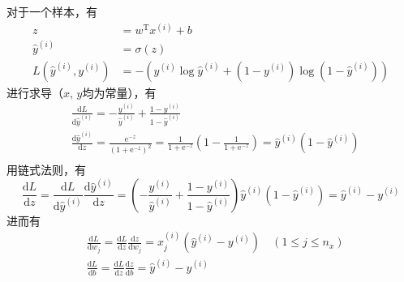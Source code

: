 	\vspace{0.5\baselineskip}
	对于一个样本，有
	\begin{equation}
		\begin{aligned}
		z &= w^\mathrm{T} x^{(i)} + b \\
		\hat{y}^{(i)} &= \sigma(z) \\
		L(\hat{y}^{(i)}, y^{(i)}) &= -(y^{(i)} \log \hat{y}^{(i)} + (1 - y^{(i)}) \log (1 - \hat{y}^{(i)}))
		\end{aligned} 
		\label{eq:gradient_logistic_sample}
	\end{equation}
	进行求导（$x$, $y$均为常量），有
	\begin{equation}
		\begin{aligned}
		&\frac{\mathrm{d}L}{\mathrm{d}\hat{y}^{(i)}} = -\frac{y^{(i)}}{\hat{y}^{(i)}} + \frac{1 - y^{(i)}}{1 - \hat{y}^{(i)}} \\
		&\frac{\mathrm{d}\hat{y}^{(i)}}{\mathrm{d}z} = \frac{\mathrm{e}^{-z}}{(1 + \mathrm{e}^{-z})^2} = \frac{1}{1 + \mathrm{e}^{-z}}(1 - \frac{1}{1 + \mathrm{e}^{-z}}) = \hat{y}^{(i)}(1 - \hat{y}^{(i)})\\
		\end{aligned}
	\end{equation}
	用链式法则，有
	\begin{equation}
		\frac{\mathrm{d}L}{\mathrm{d}z} = \frac{\mathrm{d}L}{\mathrm{d}\hat{y}^{(i)}} \frac{\mathrm{d}\hat{y}^{(i)}}{\mathrm{d}z} = (-\frac{y^{(i)}}{\hat{y}^{(i)}} + \frac{1 - y^{(i)}}{1 - \hat{y}^{(i)}})\hat{y}^{(i)}(1 - \hat{y}^{(i)}) = \hat{y}^{(i)} - y^{(i)}
	\end{equation}
	进而有
	\begin{equation}
		\begin{aligned}
		&\frac{\mathrm{d}L}{\mathrm{d}w_j} = \frac{\mathrm{d}L}{\mathrm{d}z} \frac{\mathrm{d}z}{\mathrm{d}w_j} = x_j^{(i)} (\hat{y}^{(i)} - y^{(i)}) \quad (1 \leqslant j \leqslant n_x) \\
		&\frac{\mathrm{d}L}{\mathrm{d}b} = \frac{\mathrm{d}L}{\mathrm{d}z} \frac{\mathrm{d}z}{\mathrm{d}b} = \hat{y}^{(i)} - y^{(i)}
		\end{aligned}
	\end{equation}

